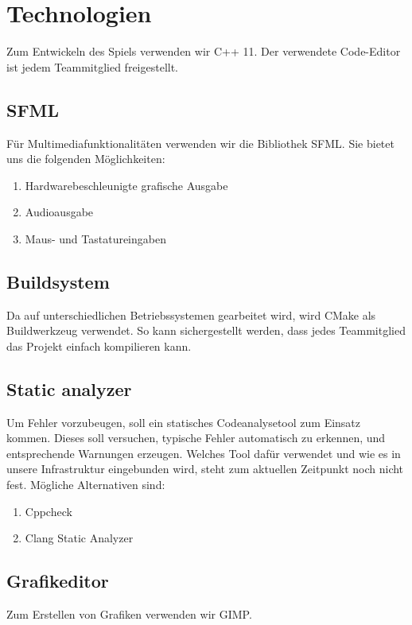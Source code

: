 
\chapter{Technologien}


Zum Entwickeln des Spiels verwenden wir C++ 11. Der verwendete Code-Editor ist jedem Teammitglied freigestellt.

\section{SFML}
Für Multimediafunktionalitäten verwenden wir die Bibliothek SFML. Sie bietet uns die folgenden Möglichkeiten:
\begin{enumerate}
	\item Hardwarebeschleunigte grafische Ausgabe
	\item Audioausgabe
	\item Maus- und Tastatureingaben
\end{enumerate}

\section{Buildsystem}
Da auf unterschiedlichen Betriebssystemen gearbeitet wird, wird CMake als Buildwerkzeug verwendet. So kann sichergestellt werden, dass jedes Teammitglied das Projekt einfach kompilieren kann.


\section{Static analyzer}
Um Fehler vorzubeugen, soll ein statisches Codeanalysetool zum Einsatz kommen. Dieses soll versuchen, typische Fehler automatisch zu erkennen, und entsprechende Warnungen erzeugen. Welches Tool dafür verwendet und wie es in unsere Infrastruktur eingebunden wird, steht zum aktuellen Zeitpunkt noch nicht fest. Mögliche Alternativen sind: 

\begin{enumerate}
	\item Cppcheck
	\item Clang Static Analyzer
\end{enumerate}

\section{Grafikeditor}
Zum Erstellen von Grafiken verwenden wir GIMP.
